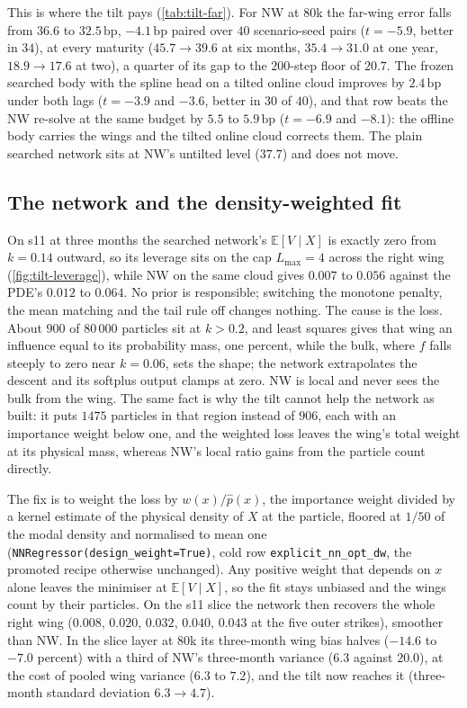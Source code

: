 \documentclass[11pt,a4paper]{article}
\newcommand{\E}{\mathbb{E}}
\newcommand{\Lmax}{L_{\max}}
\newcommand{\bp}{\,\mathrm{bp}}
\newcommand{\code}[1]{\texttt{#1}}
\begin{document}
This is where the tilt pays (\cref{tab:tilt-far}). For NW at $80$k the far-wing error falls from $36.6$ to $32.5\bp$, $-4.1\bp$ paired over $40$ scenario-seed pairs ($t=-5.9$, better in $34$), at every maturity ($45.7\to39.6$ at six months, $35.4\to31.0$ at one year, $18.9\to17.6$ at two), a quarter of its gap to the $200$-step floor of $20.7$. The frozen searched body with the spline head on a tilted online cloud improves by $2.4\bp$ under both lags ($t=-3.9$ and $-3.6$, better in $30$ of $40$), and that row beats the NW re-solve at the same budget by $5.5$ to $5.9\bp$ ($t=-6.9$ and $-8.1$): the offline body carries the wings and the tilted online cloud corrects them. The plain searched network sits at NW's untilted level ($37.7$) and does not move.

\subsection{The network and the density-weighted fit}\label{sec:tilt-dw}
On s11 at three months the searched network's $\E[V\mid X]$ is exactly zero from $k=0.14$ outward, so its leverage sits on the cap $\Lmax=4$ across the right wing (\cref{fig:tilt-leverage}), while NW on the same cloud gives $0.007$ to $0.056$ against the PDE's $0.012$ to $0.064$. No prior is responsible; switching the monotone penalty, the mean matching and the tail rule off changes nothing. The cause is the loss. About $900$ of $80\,000$ particles sit at $k>0.2$, and least squares gives that wing an influence equal to its probability mass, one percent, while the bulk, where $f$ falls steeply to zero near $k=0.06$, sets the shape; the network extrapolates the descent and its softplus output clamps at zero. NW is local and never sees the bulk from the wing. The same fact is why the tilt cannot help the network as built: it puts $1475$ particles in that region instead of $906$, each with an importance weight below one, and the weighted loss leaves the wing's total weight at its physical mass, whereas NW's local ratio gains from the particle count directly.

The fix is to weight the loss by $w(x)/\hat p(x)$, the importance weight divided by a kernel estimate of the physical density of $X$ at the particle, floored at $1/50$ of the modal density and normalised to mean one (\code{NNRegressor(design\_weight=True)}, cold row \code{explicit\_nn\_opt\_dw}, the promoted recipe otherwise unchanged). Any positive weight that depends on $x$ alone leaves the minimiser at $\E[V\mid X]$, so the fit stays unbiased and the wings count by their particles. On the s11 slice the network then recovers the whole right wing ($0.008$, $0.020$, $0.032$, $0.040$, $0.043$ at the five outer strikes), smoother than NW. In the slice layer at $80$k its three-month wing bias halves ($-14.6$ to $-7.0$ percent) with a third of NW's three-month variance ($6.3$ against $20.0$), at the cost of pooled wing variance ($6.3$ to $7.2$), and the tilt now reaches it (three-month standard deviation $6.3\to4.7$).
\end{document}
